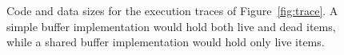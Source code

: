\begin{comment}

\subsection{Minimum Buffer Size between {\filters}}

As illustrated above, the amount of buffering in a {\pipeline} can
be affected greatly by the order of executions of {\filters} in the
{\pipeline}.  The following equation calculates the minimal buffer
size required in order for two {\filters} to be able to push data
between each other indefinitely in the most buffer-efficient way.
Buffers this size cannot always be achieved, because some
components require that data be buffered up for execution (ex.
{\feedbackloops} require data to exist internally in order to
execution to advance) or because extra latency constrains require
additional buffering.

\begin{equation}
buffer_{A \to B} = \left\lceil {{peek_B} \over {\gcd(push_A,
pop_B)}} - 1 \right\rceil \gcd (push_A, pop_B) + push_A
\end{equation}

\emph{I can explain this equation, but I cannot prove it.  what
should I do with this?  it's not necessary for the thesis, but it
is a neat result we never published (PLDI submission), nor have I
seen it in any other papers (nobody does peeking, so it can't be
anywhere else)}

\end{comment}

\begin{figure}[t]
\caption{Code and data sizes for the execution traces of
Figure~\ref{fig:trace}.  A simple buffer implementation would hold
both live and dead items, while a shared buffer implementation would
hold only live items.  \protect\label{fig:codedata}}
\vspace{-12pt}
\end{figure}
